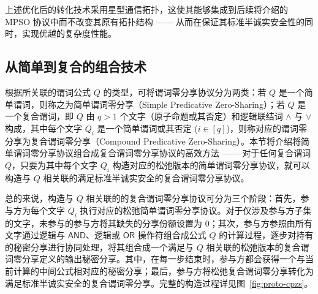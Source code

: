 上述优化后的转化技术采用星型通信拓扑，这使其能够集成到后续将介绍的 MPSO 协议中而不改变其原有拓扑结构 —— 从而在保证其标准半诚实安全性的同时，实现优越的复杂度性能。

\subsection{从简单到复合的组合技术}\label{compound-pzs}

根据所关联的谓词公式 $Q$ 的类型，可将谓词零分享协议分为两类：若 $Q$ 是一个简单谓词，则称之为简单谓词零分享（Simple Predicative Zero-Sharing）；若 $Q$ 是一个复合谓词，即 $Q$ 由 $q>1$ 个文字（原子命题或其否定）和逻辑联结词 $\land$ 与 $\lor$ 构成，其中每个文字 $Q_i$ 是一个简单谓词或其否定 ($i \in [q]$)，则称对应的谓词零分享为复合谓词零分享（Compound Predicative Zero-Sharing）。本节将介绍将简单谓词零分享协议组合成复合谓词零分享协议的高效方法 —— 对于任何复合谓词 $Q$，只要为其中每个文字 $Q_i$ 构造对应的松弛版本的简单谓词零分享协议，就可以构造与 $Q$ 相关联的满足标准半诚实安全的复合谓词零分享协议。

总的来说，构造与 $Q$ 相关联的的复合谓词零分享协议可分为三个阶段：首先，参与方为每个文字 $Q_i$ 执行对应的松弛简单谓词零分享协议。对于仅涉及参与方子集的文字，未参与的参与方将其缺失的分享份额设置为 $0$；其次，参与方参照由所有文字通过逻辑与 $\mathsf{AND}$、逻辑或 $\mathsf{OR}$ 操作符组合成公式 $Q$ 的计算过程，逐步对持有的秘密分享进行协同处理，将其组合成一个满足与 $Q$ 相关联的松弛版本的复合谓词零分享定义的输出秘密分享。其中，在每一步结束时，参与方都会获得一个与当前计算的中间公式相对应的秘密分享；最后，参与方将松弛复合谓词零分享转化为满足标准半诚实安全的复合谓词零分享。完整的构造过程详见图~\ref{fig:proto-cpzs}。

